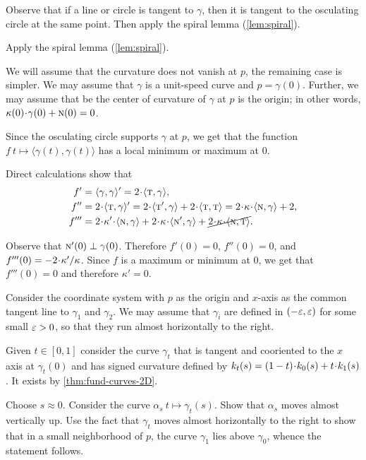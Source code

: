 Observe that if a line or circle is tangent to $\gamma$,
then it is tangent to the osculating circle at the same point.
Then apply the spiral lemma (\ref{lem:spiral}).

\setcounter{eqtn}{0}

Apply the spiral lemma (\ref{lem:spiral}).

We will assume that the curvature does not vanish at $p$, the remaining case is simpler.
We may assume that $\gamma$ is a unit-speed curve and $p=\gamma(0)$.
Further, we may assume that be the center of curvature of $\gamma$ at $p$ is the origin;
in other words, $\kappa(0)\cdot\gamma(0)+ \norm(0)=0$.

Since the osculating circle supports $\gamma$ at $p$,
we get that the function $f\:t\mapsto \langle\gamma(t),\gamma(t)\rangle$ has a local minimum or maximum at $0$.

Direct calculations show that 
\begin{align*}
f'
&=\langle\gamma,\gamma\rangle'
=2\cdot\langle\tan,\gamma\rangle,
\\
f''
&=2\cdot\langle\tan,\gamma\rangle'
=2\cdot\langle\tan',\gamma\rangle+2\cdot\langle\tan,\tan\rangle
=2\cdot\kappa\cdot\langle\norm,\gamma\rangle+2,
\\
f'''
&=2\cdot\kappa'\cdot\langle\norm,\gamma\rangle
+2\cdot\kappa\cdot\langle\norm',\gamma\rangle+\cancel{2\cdot\kappa\cdot\langle\norm,\tan\rangle}.
\end{align*}

Observe that $\text{\sc{n}}'(0)\perp\gamma(0)$.
Therefore $f'(0)=0$, $f''(0)=0$, and $f'''(0)\z=-2\cdot\kappa'/\kappa$.
Since $f$ is a maximum or minimum at $0$, we get that $f'''(0)=0$ and therefore
$\kappa'=0$.

 Consider the coordinate system with $p$ as the origin and $x$-axis as the common tangent line to $\gamma_1$ and $\gamma_2$.
We may assume that $\gamma_i$ are defined in $(-\varepsilon,\varepsilon)$ for some small $\varepsilon>0$,
so that they run almost horizontally to the right.

Given $t\in[0,1]$ consider the curve $\gamma_t$ that is tangent and cooriented to the $x$ axis at  $\gamma_t(0)$ and has signed curvature defined by $\skur_t(s)=(1\z-t)\cdot\skur_0(s)+t\cdot\skur_1(s)$.
It exists by \ref{thm:fund-curves-2D}.

Choose $s\approx 0$.
Consider the curve $\alpha_s\:t\mapsto \gamma_t(s)$.
Show that $\alpha_s$ moves almost vertically up.
Use the fact that $\gamma_t$ moves almost horizontally to the right to show that in a small neighborhood of $p$, the curve $\gamma_1$ lies above $\gamma_0$,
whence the statement follows.

